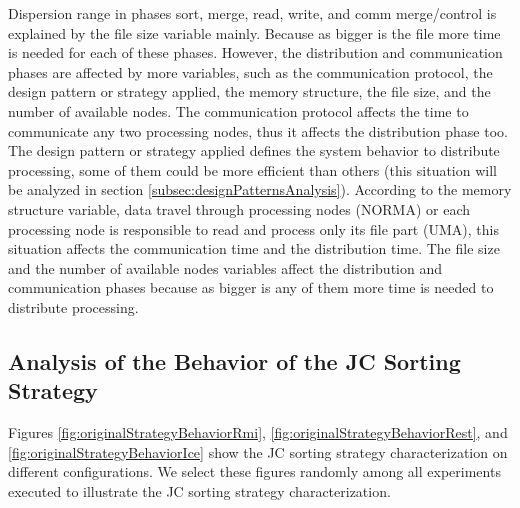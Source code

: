 Dispersion range in phases sort, merge, read, write, and comm merge/control is explained by the file size variable mainly. Because as bigger is the file more time is needed for each of these phases. However, the distribution and communication phases are affected by more variables, such as the communication protocol, the design pattern or strategy applied, the memory structure, the file size, and the number of available nodes. The communication protocol affects the time to communicate any two processing nodes, thus it affects the distribution phase too. The design pattern or strategy applied defines the system behavior to distribute processing, some of them could be more efficient than others (this situation will be analyzed in section \ref{subsec:designPatternsAnalysis}).  According to the memory structure variable, data travel through processing nodes (NORMA) or each processing node is responsible to read and process only its file part (UMA), this situation affects the communication time and the distribution time. The file size and the number of available nodes variables affect the distribution and communication phases because as bigger is any of them more time is needed to distribute processing.


\subsection{Analysis of the Behavior of the JC Sorting Strategy }
Figures \ref{fig:originalStrategyBehaviorRmi}, \ref{fig:originalStrategyBehaviorRest}, and \ref{fig:originalStrategyBehaviorIce} show the JC sorting strategy characterization on different configurations. We select these figures randomly among all experiments executed to illustrate the JC sorting strategy characterization.

